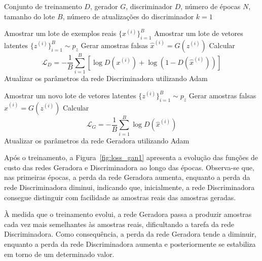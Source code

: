 \begin{algorithm}
\caption{Treinamento da GAN}
\label{alg:gan_train}
\begin{algorithmic}[1]

\Require Conjunto de treinamento $D$, gerador $G$, discriminador $D$, número de épocas $N$, tamanho do lote $B$, número de atualizações do discriminador $k=1$

            \State Amostrar um lote de exemplos reais $\{x^{(i)}\}_{i=1}^{B}$
            \State Amostrar um lote de vetores latentes $\{z^{(i)}\}_{i=1}^{B}\sim p_z$
            \State Gerar amostras falsas $\hat{x}^{(i)} = G(z^{(i)})$
            \State Calcular
            \[
            \mathcal{L}_D
            =
            -\frac{1}{B}
            \sum_{i=1}^{B}
            \left[
            \log D(x^{(i)})
            +
            \log\left(1-D(\hat{x}^{(i)})\right)
            \right]
            \]
            \State Atualizar os parâmetros da rede Discriminadora utilizando Adam
        \EndFor

        \State Amostrar um novo lote de vetores latentes $\{z^{(i)}\}_{i=1}^{B}\sim p_z$
        \State Gerar amostras falsas $\hat{x}^{(i)} = G(z^{(i)})$
        \State Calcular
        \[
        \mathcal{L}_G
        =
        -\frac{1}{B}
        \sum_{i=1}^{B}
        \log D(\hat{x}^{(i)})
        \]
        \State Atualizar os parâmetros da rede Geradora utilizando Adam

    \EndFor
\EndFor

\end{algorithmic}
\end{algorithm}

Após o treinamento, a Figura~\ref{fig:loss_gan1} apresenta a evolução das funções de custo das redes Geradora e Discriminadora ao longo das épocas. Observa-se que, nas primeiras épocas, a perda da rede Geradora aumenta, enquanto a perda da rede Discriminadora diminui, indicando que, inicialmente, a rede Discriminadora consegue distinguir com facilidade as amostras reais das amostras geradas.

À medida que o treinamento evolui, a rede Geradora passa a produzir amostras cada vez mais semelhantes às amostras reais, dificultando a tarefa da rede Discriminadora. Como consequência, a perda da rede Geradora tende a diminuir, enquanto a perda da rede Discriminadora aumenta e posteriormente se estabiliza em torno de um determinado valor.

